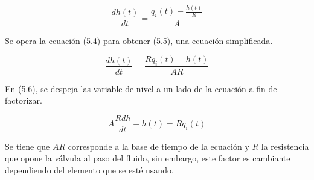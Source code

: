 \documentclass[a4paper,12pt,twoside]{proyectotanquesecci}
\begin{document}
\begin{equation}
\frac {dh\left( t\right) }{dt}=\frac {q_{i}(t)-\frac {h(t)}{R}}{A}
\end{equation}

Se opera la ecuación (5.4) para obtener (5.5), una ecuación simplificada.

\begin{equation}
\frac {dh\left( t\right) }{dt}=\frac {Rq_{i}(t)-h(t)}{AR}
\end{equation}










En (5.6), se despeja las variable de nivel a un lado de la ecuación a fin de factorizar.

\begin{equation}
A\frac {Rdh}{dt}+h\left( t\right) =Rq_{i}\left( t\right)
\end{equation}

Se tiene que $AR$ corresponde a la base de tiempo de la ecuación y $R$ la resistencia que opone la válvula al paso del fluido, sin embargo, este factor es cambiante dependiendo del elemento que se esté usando.
\end{document}
